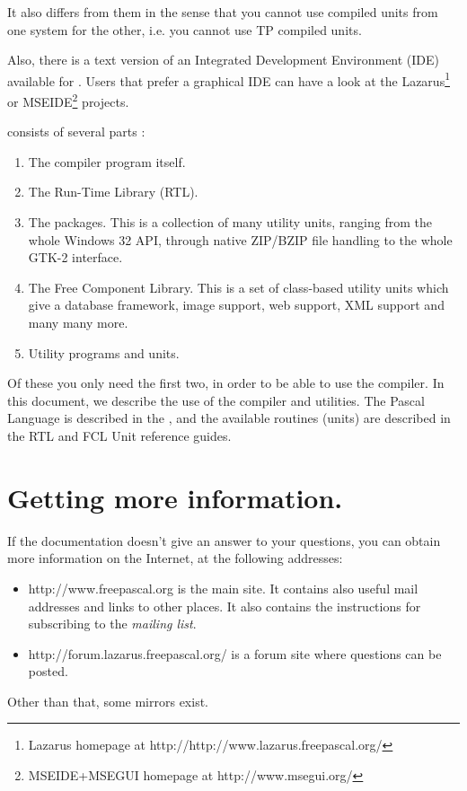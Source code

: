 It also differs from them in the sense that you cannot use compiled units
from one system for the other, i.e. you cannot use TP compiled units.

Also, there is a text version of an Integrated Development Environment (IDE) 
available for \fpc. Users that prefer a graphical IDE can have a look at the
Lazarus\footnote{Lazarus homepage at http://http://www.lazarus.freepascal.org/ }
or MSEIDE\footnote{MSEIDE+MSEGUI homepage at http://www.msegui.org/ } projects.

\fpc consists of several parts :
\begin{enumerate}
\item The compiler program itself.
\item The Run-Time Library (RTL).
\item The packages. This is a collection of many utility units, ranging from
the whole Windows 32 API, through native ZIP/BZIP file handling to the whole GTK-2 interface.
\item The Free Component Library. This is a set of class-based utility units which give
a database framework, image support, web support, XML support and many many more.
\item Utility programs and units.
\end{enumerate}

Of these you only need the first two, in order to be able to use the compiler.
In this document, we describe the use of the compiler and utilities. 
The Pascal Language is described in the , and the available routines
(units) are described in the RTL and FCL Unit reference guides.

\section{Getting more information.}
If the documentation doesn't give an answer to your questions,
you can obtain more information on the Internet, at the following addresses:
\begin{itemize}
\item
{}
{http://www.freepascal.org} is the main
site. It contains also useful mail addresses and
links to other places.
It also contains the instructions for subscribing to the
\textit{mailing list}.

\item
{}
{http://forum.lazarus.freepascal.org/} is a forum site where
questions can be posted.
\end{itemize}
Other than that, some mirrors exist.

